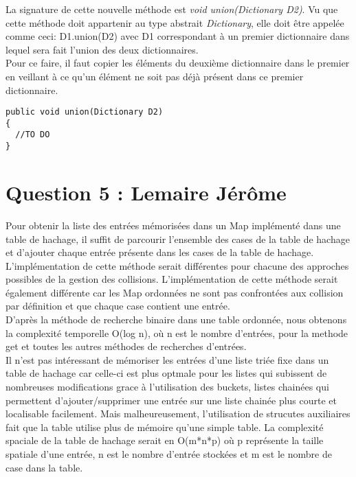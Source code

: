\documentclass[10pt,a4paper]{article}
\begin{document}
La signature de cette nouvelle méthode est \emph{void union(Dictionary D2)}. Vu que cette méthode doit appartenir au type abstrait \emph{Dictionary}, elle doit être appelée comme ceci: D1.union(D2) avec D1 correspondant à un premier dictionnaire dans lequel sera fait l'union des deux dictionnaires. \\
\newline
Pour ce faire, il faut copier les éléments du deuxième dictionnaire dans le premier en veillant à ce qu'un  élément ne soit pas déjà présent dans ce premier dictionnaire.

\begin{lstlisting}
public void union(Dictionary D2)
{
  //TO DO
}
\end{lstlisting}

\section*{Question 5 : Lemaire Jérôme}


Pour obtenir la liste des entrées mémorisées dans un Map implémenté dans une table de hachage, il suffit de parcourir l'ensemble des cases de la table de hachage et d'ajouter chaque entrée présente dans les cases de la table de hachage. L'implémentation de cette méthode serait différentes pour chacune des approches possibles de la gestion des collisions. L'implémentation de cette méthode serait également différente car les Map ordonnées ne sont pas confrontées aux collision par définition et que chaque case contient une entrée.\\
D'après la méthode de recherche binaire dans une table ordonnée, nous obtenons la complexité temporelle O(log n), où n est le nombre d'entrées, pour la methode get et toutes les autres méthodes de recherches d'entrées.\\

Il n'est pas intéressant de mémoriser les entrées d'une liste triée fixe dans un table de hachage car celle-ci est plus optmale pour les listes qui subissent de nombreuses modifications grace à l'utilisation des buckets, listes chainées qui permettent d'ajouter/supprimer une entrée sur une liste chainée plus courte et localisable facilement. Mais malheureusement, l'utilisation de strucutes auxiliaires fait que la table utilise plus de mémoire qu'une simple table. La complexité spaciale de la table de hachage serait en O(m*n*p) où p représente la taille spatiale d'une entrée, n est le nombre d'entrée stockées et m est le nombre de case dans la table. 
 
\end{document}
